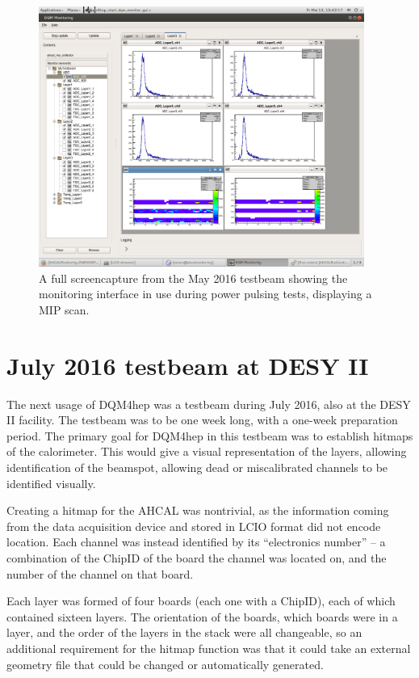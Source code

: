 \begin{figure}[t]
	\centering
	\includegraphics[width=0.95\textwidth]{../Pictures/PowerPulsingMipScans-May2016.png}
	\caption{A full screencapture from the May 2016 testbeam showing the monitoring interface in use during power pulsing tests, displaying a \acrshort{MIP} scan.}
	\label{figure:aida/may2016/overview}
\end{figure}

\section{July 2016 testbeam at DESY II}
The next usage of \acrshort{DQM4hep} was a testbeam during July 2016, also at the DESY II facility. The testbeam was to be one week long, with a one-week preparation period. The primary goal for \acrshort{DQM4hep} in this testbeam was to establish hitmaps of the calorimeter. This would give a visual representation of the layers, allowing identification of the beamspot, allowing dead or miscalibrated channels to be identified visually.

Creating a hitmap for the \acrshort{AHCAL} was nontrivial, as the information coming from the data acquisition device and stored in LCIO format did not encode location. Each channel was instead identified by its ``electronics number'' -- a combination of the ChipID of the board the channel was located on, and the number of the channel on that board.

Each layer was formed of four boards (each one with a ChipID), each of which contained sixteen layers. The orientation of the boards, which boards were in a layer, and the order of the layers in the stack were all changeable, so an additional requirement for the hitmap function was that it could take an external geometry file that could be changed or automatically generated. 

